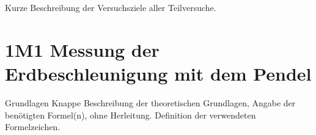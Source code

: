 \documentclass[twoside]{protokoll}
\begin{document}
\begin{versuchsziele}
  Kurze Beschreibung der Versuchsziele aller Teilversuche.
\end{versuchsziele}

\section{1M1 Messung der Erdbeschleunigung mit dem Pendel}

\begin{aufgabe}{Grundlagen}
  Knappe Beschreibung der theoretischen Grundlagen, Angabe der
  benötigten Formel(n), ohne Herleitung. Definition der verwendeten
  Formelzeichen.
\end{aufgabe}
\end{document}
